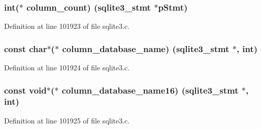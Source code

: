\subsubsection[{column\+\_\+count}]{\setlength{\rightskip}{0pt plus 5cm}int($\ast$ column\+\_\+count) ({\bf sqlite3\+\_\+stmt} $\ast$p\+Stmt)}\label{structsqlite3__api__routines_a520b006b5146d066933c2fcea314366e}


Definition at line 101923 of file sqlite3.\+c.

\hypertarget{structsqlite3__api__routines_a18d0b5a6a6a10404c348b987f328127c}{}
\subsubsection[{column\+\_\+database\+\_\+name}]{\setlength{\rightskip}{0pt plus 5cm}const char$\ast$($\ast$ column\+\_\+database\+\_\+name) ({\bf sqlite3\+\_\+stmt} $\ast$, int)}\label{structsqlite3__api__routines_a18d0b5a6a6a10404c348b987f328127c}


Definition at line 101924 of file sqlite3.\+c.

\hypertarget{structsqlite3__api__routines_a985c0731ddd0bafff880747a307a43d9}{}
\subsubsection[{column\+\_\+database\+\_\+name16}]{\setlength{\rightskip}{0pt plus 5cm}const void$\ast$($\ast$ column\+\_\+database\+\_\+name16) ({\bf sqlite3\+\_\+stmt} $\ast$, int)}\label{structsqlite3__api__routines_a985c0731ddd0bafff880747a307a43d9}


Definition at line 101925 of file sqlite3.\+c.

\hypertarget{structsqlite3__api__routines_ae97b4b0b98a715c66528a87e57160c1e}{}
